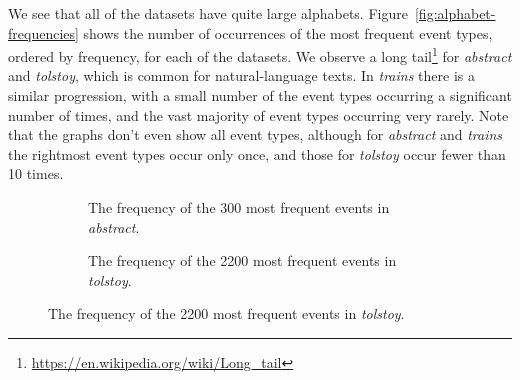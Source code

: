 We see that all of the datasets have quite large alphabets. Figure~\ref{fig:alphabet-frequencies} shows the number of occurrences of the most frequent event types, ordered by frequency, for each of the datasets. We observe a long tail\footnote{\url{https://en.wikipedia.org/wiki/Long_tail}} for \emph{abstract} and \emph{tolstoy}, which is common for natural-language texts. In \emph{trains} there is a similar progression, with a small number of the event types occurring a significant number of times, and the vast majority of event types occurring very rarely. Note that the graphs don't even show all event types, although for \emph{abstract} and \emph{trains} the rightmost event types occur only once, and those for \emph{tolstoy} occur fewer than 10 times.

\begin{figure}

\begin{subfigure}[b]{0.5\textwidth}
\centering


\caption{The frequency of the 300 most frequent events in \emph{abstract}.}
\label{fig:frequency-plot-nsf}
\end{subfigure}%
\begin{subfigure}[b]{0.5\textwidth}
\centering


\caption{The frequency of the 2200 most frequent events in \emph{tolstoy}.}
\label{fig:frequency-plot-tolstoy}
\end{subfigure}


\end{figure}
